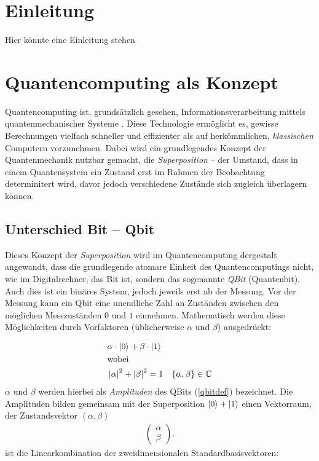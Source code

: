 \chapter{Einleitung}
Hier könnte eine Einleitung stehen

\chapter{Quantencomputing als Konzept}
Quantencomputing ist, grundsätzlich gesehen, Informationsverarbeitung mittels quantenmechanischer Systeme \cite[1]{NielsenChuang}.
Diese Technologie ermöglicht es, gewisse Berechnungen vielfach schneller und effizienter als auf herkömmlichen, \textit{klassischen} Computern vorzunehmen. Dabei wird ein grundlegendes Konzept der Quantenmechanik nutzbar gemacht, die \textit{Superposition} -- der Umstand, dass in einem Quantensystem ein Zustand erst im Rahmen der Beobachtung determinitert wird, davor jedoch verschiedene Zustände sich zugleich überlagern können. 


\section{Unterschied Bit -- Qbit}
Dieses Konzept der \textit{Superposition} wird im Quantencomputing dergestalt angewandt, dass die grundlegende atomare Einheit des Quantencomputings nicht, wie im Digitalrechner, das Bit ist, sondern das sogenannte \textit{QBit} (Quantenbit).
Auch dies ist ein binäres System, jedoch jeweils erst ab der Messung.
Vor der Messung kann ein Qbit eine unendliche Zahl an Zuständen zwischen den möglichen Messzuständen $0$ und $1$ einnehmen.
Mathematisch werden diese \glqq Möglichkeiten\grqq{} durch Vorfaktoren (üblicherweise $\alpha$ und $\beta$) ausgedrückt:

\begin{align}
&\alpha \cdot \ket{0}+\beta \cdot \ket{1} \label{qbitdef} \\
&\text{wobei}\notag \\ 
&\left\lvert \alpha \right\rvert ^2 + \left\lvert \beta \right\rvert ^2 = 1 & \{ \alpha, \beta \} \in \mathbb{C}
\end{align}
$\alpha$ und $\beta$ werden hierbei als \textit{Amplituden} des QBits (\ref{qbitdef}) bezeichnet.
Die Amplituden bilden gemeinsam mit der Superposition $\ket{0}+\ket{1}$ einen Vektorraum, der Zustandsvektor $(\alpha, \beta)$
\begin{align}
    \begin{pmatrix}
        \alpha\\
        \beta
    \end{pmatrix}.
\end{align}
ist die Linearkombination der zweidimensionalen Standardbasisvektoren\cite[22]{Homeister}:

